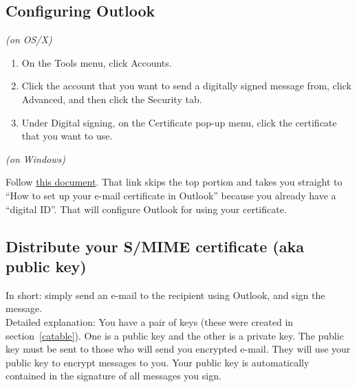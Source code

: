 \documentclass[pdftex,12pt,titlepage=false]{scrartcl}
\begin{document}
\subsection{Configuring Outlook}\label{outlookcfg}
\begin{minipage}[t]{0.48\textwidth}
  \centerline{\textsl{(on OS/X)}}
  \begin{enumerate}
  \item On the Tools menu, click Accounts.
  \item Click the account that you want to send a digitally signed message from, click Advanced, and then click the Security tab.
  \item Under Digital signing, on the Certificate pop-up menu, click the certificate that you want to use.
  \end{enumerate}
\end{minipage}\hfill%
\begin{minipage}[t]{0.48\textwidth}
  \centerline{\textsl{(on Windows)}}\vspace{0.5em}Follow
  \href{https://www.ablebits.com/office-addins-blog/2014/04/11/email-encryption-outlook/#setup-email-certificate}{this
    document}.  That link skips the top portion and takes you straight
  to ``How to set up your e-mail certificate in Outlook'' because you
  already have a ``digital ID''.  That will configure Outlook for
  using your certificate.
\end{minipage}


\subsection{Distribute your S/MIME certificate (aka public key)}\label{distribution}
In short: simply send an e-mail to the recipient using Outlook, and sign the message.\\

Detailed explanation: You have a pair of keys (these were created in
section~\ref{catable}).  One is a public key and the other is a
private key.  The public key must be sent to those who will send you
encrypted e-mail.  They will use your public key to encrypt messages
to you.  Your public key is automatically contained in the signature
of all messages you sign.
\end{document}
